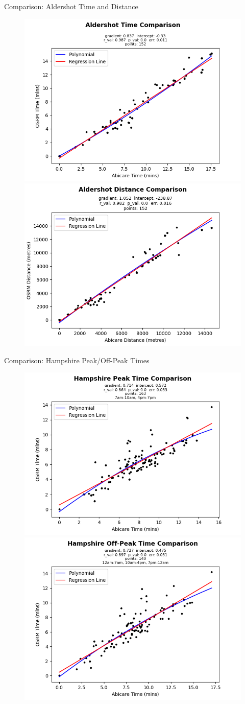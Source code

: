 \documentclass[usenames,dvipsnames]{beamer}
\begin{document}
\begin{frame}{Comparison: Aldershot Time and Distance}
	\begin{figure}
		\includegraphics[width=0.5\linewidth]{figures/Aldershot_time_comparison_abi}%
		\includegraphics[width=0.5\linewidth]{figures/Aldershot_dist_comparison_abi}
	\end{figure}
\end{frame}

\begin{frame}{Comparison: Hampshire Peak/Off-Peak Times}
	\begin{figure}
		\includegraphics[width=0.5\linewidth]{figures/Hampshire_peaktime_comparison_abi}%
		\includegraphics[width=0.5\linewidth]{figures/Hampshire_offpeaktime_comparison_abi}
	\end{figure}
\end{frame}
\end{document}

